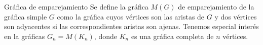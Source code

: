 \documentclass[final,xcolor=svgnames]{beamer}
\DeclareMathOperator{\sgn}{sgn}
\begin{document}
\begin{frame}{}
\begin{columns}
\begin{column}{0.5\textwidth}
        
        
      \begin{block}{Gráfica de emparejamiento}
        Se define la \alert{gráfica $M(G)$ de emparejamiento} de la gráfica
        simple $G$ como la gráfica cuyos vértices son las aristas de
        $G$ y dos vértices son adyacentes si las correspondientes
        aristas son ajenas. Tenemos especial interés en la gráficas
        $G_{n}=M(K_{n})$, donde $K_{n}$ es una gráfica completa de $n$ vértices.
      \end{block}


\end{column}
\end{columns}
\end{frame}
\end{document}
